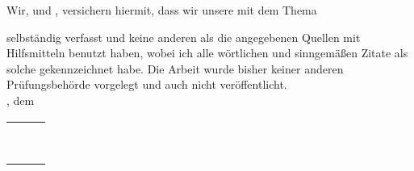 \clearpage
{}

Wir, \autorEinsName  und \autorZweiName, versichern hiermit, dass wir unsere \textbf{\betreff} mit dem Thema
\begin{quote}
\textit{\kompletterTitel}
\end{quote}
selbständig verfasst und keine anderen als die angegebenen Quellen mit Hilfsmitteln benutzt haben,
wobei ich alle wörtlichen und sinngemäßen Zitate als solche gekennzeichnet habe. Die Arbeit
wurde bisher keiner anderen Prüfungsbehörde vorgelegt und auch nicht veröffentlicht. \\[6ex]

\abgabeOrt, dem \abgabeTermin\\

\begin{tabular}{lll}
	\rule[-0.2cm]{5.5cm}{0.5pt} & \rule[-0.2cm]{5.5cm}{0.5pt}\\
	\\
	\textsc{\autorEinsName} & \textsc{\autorZweiName}\\
\end{tabular}


